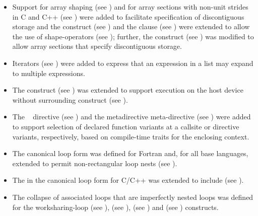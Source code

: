 \begin{itemize}
\item Support for array shaping (see ) and 
      for array sections with non-unit strides  in C and C++ (see 
      ) were added to facilitate specification 
      of discontiguous storage and the  construct (see 
      ) and the  clause 
      (see ) were extended to allow the use 
      of shape-operators (see ); further, the 
       construct (see ) was modified to allow array sections that specify 
      discontiguous storage.

\item Iterators (see ) were added to express that an
      expression in a list may expand to multiple expressions.


\item The  construct (see ) was
      extended to support execution on the host device without surrounding
       construct (see ).

\item The ~ directive (see
      ) and the metadirective
      meta-directive (see ) were
      added to support selection of declared function variants at a callsite
      or directive variants, respectively, based on compile-time traits for
      the enclosing context.

\item The canonical loop form was defined for Fortran and, for all base
    languages, extended to permit non-rectangular loop nests (see
    ).

\item The  in the canonical loop form for C/C++ was
      extended to include \code{!=} (see ).

\item The collapse of associated loops that are imperfectly nested loops
      was defined for the worksharing-loop (see ),
       (see ), 
      (see ) and  (see
      ) constructs.


\end{itemize}
